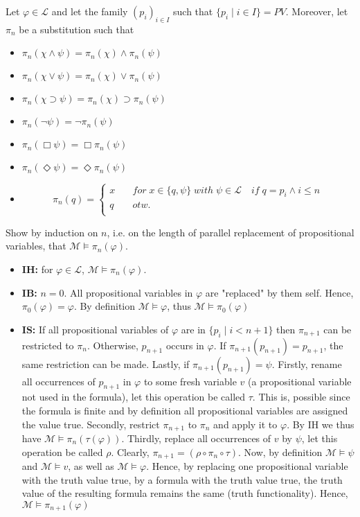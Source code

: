 \documentclass[11pt,a4paper]{article}
\newcommand{\lto}{\supset}
\newcommand{\some}{\Diamond}
\newcommand{\all}{\Box}
\begin{document}
Let $\varphi \in \mathcal{L}$ and let the family $(p_i)_{i \in I}$ such that $\{ p_i \mid i \in I\} = PV$. Moreover, let $\pi_n$ be a substitution such that
\begin{itemize}
\item $\pi_n(\chi \land \psi) = \pi_n(\chi) \land \pi_n(\psi) $
\item $\pi_n(\chi \lor \psi) = \pi_n(\chi) \lor \pi_n(\psi) $
\item $\pi_n(\chi \lto \psi) = \pi_n(\chi) \lto \pi_n(\psi) $
\item $\pi_n(\neg \psi) =\neg \pi_n(\psi) $
\item $\pi_n(\all \psi) =\all \pi_n(\psi) $
\item $\pi_n(\some \psi) =\some \pi_n(\psi) $
\item \begin{equation*}
\pi_n(q) = \begin{cases}
x  & \quad \mathit{for} \; x \in \{q, \psi\} \; \mathit{with} \; \psi \in \mathcal{L} \quad if \; q=p_i \land i\leq n\\
q & \quad otw.\\
\end{cases}
\end{equation*}
\end{itemize}

Show by induction on $n$, i.e. on the length of parallel replacement of propositional variables, that $\mathcal{M} \models \pi_n(\varphi)$. 
\begin{itemize}
\item \textbf{IH:}  for $\varphi \in \mathcal{L}$, $\mathcal{M} \models \pi_n(\varphi)$.
\item \textbf{IB:}  $n=0$. All propositional variables in $\varphi$ are "replaced" by them self. Hence, $\pi_0(\varphi)=\varphi$. By definition $\mathcal{M} \models \varphi$, thus  $\mathcal{M} \models \pi_0(\varphi)$
\item \textbf{IS:} If all propositional variables of $\varphi$ are in $\{p_i \mid i < n+1\}$ then $\pi_{n+1}$ can be restricted to $\pi_n$. Otherwise, $p_{n+1}$ occurs in $\varphi$. If $\pi_{n+1}(p_{n+1})=p_{n+1}$, the same restriction can be made. Lastly, if $\pi_{n+1}(p_{n+1})=\psi$. Firstly, rename all occurrences of $p_{n+1}$ in $\varphi$ to some fresh variable $v$ (a propositional variable not used in the formula), let this operation be called $\tau$. This is, possible since the formula is finite and by definition all propositional variables are assigned the value true. Secondly, restrict $\pi_{n+1}$ to $\pi_n$ and apply it to $\varphi$. By IH we thus have $\mathcal{M} \models \pi_n(\tau(\varphi))$. Thirdly, replace all occurrences of $v$ by $\psi$, let this operation be called $\rho$. Clearly, $\pi_{n+1}=(\rho \circ \pi_n \circ \tau)$. Now, by definition $\mathcal{M}\models \psi$ and $\mathcal{M} \models v$, as well as $\mathcal{M} \models \varphi$. Hence, by replacing one propositional variable with the truth value true, by a formula with the truth value true, the truth value of the resulting formula remains the same (truth functionality). Hence, $\mathcal{M} \models \pi_{n+1}(\varphi)$
\end{itemize}
\end{document}
